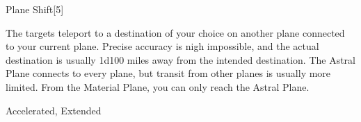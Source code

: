 \begin{spellsection}{Plane Shift}[5]
\begin{spellcontent}
\begin{spelltargetinginfo}
\end{spelltargetinginfo}
\begin{spelleffects}
\spelleffect
The targets teleport to a destination of your choice on another plane connected to your current plane.
Precise accuracy is nigh impossible, and the actual destination is usually 1d100 miles away from the intended destination.
The Astral Plane connects to every plane, but transit from other planes is usually more limited. From the Material Plane, you can only reach the Astral Plane.
\end{spelleffects}
\end{spellcontent}
\begin{spellfooter}
 Accelerated, Extended
\end{spellfooter}
\begin{spellsubcontent}
\end{spellsubcontent}
\end{spellsection}
